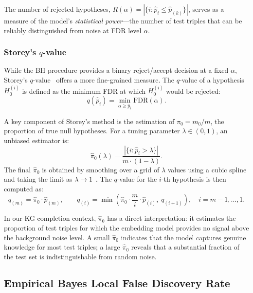 The number of rejected hypotheses, $R(\alpha) = |\{i: \hat{p}_i \leq \hat{p}_{(k)}\}|$, serves as a measure of the model's \emph{statistical power}---the number of test triples that can be reliably distinguished from noise at FDR level $\alpha$.

\subsubsection{Storey's $q$-value}
\label{subsec:qvalue}

While the BH procedure provides a binary reject/accept decision at a fixed $\alpha$, Storey's $q$-value~\cite{storey2002direct, storey2003statistical} offers a more fine-grained measure.
The $q$-value of a hypothesis $H_0^{(i)}$ is defined as the minimum FDR at which $H_0^{(i)}$ would be rejected:
\begin{equation}
    q(\hat{p}_i) = \min_{\alpha \geq \hat{p}_i} \text{FDR}(\alpha).
\end{equation}

A key component of Storey's method is the estimation of $\pi_0 = m_0 / m$, the proportion of true null hypotheses.
For a tuning parameter $\lambda \in (0, 1)$, an unbiased estimator is:
\begin{equation}
    \hat{\pi}_0(\lambda) = \frac{|\{i : \hat{p}_i > \lambda\}|}{m \cdot (1 - \lambda)}.
    \label{eq:pi0}
\end{equation}
The final $\hat{\pi}_0$ is obtained by smoothing over a grid of $\lambda$ values using a cubic spline and taking the limit as $\lambda \to 1$~\cite{storey2002direct}.
The $q$-value for the $i$-th hypothesis is then computed as:
\begin{equation}
    q_{(m)} = \hat{\pi}_0 \cdot \hat{p}_{(m)}, \qquad
    q_{(i)} = \min\left(\hat{\pi}_0 \cdot \frac{m}{i} \cdot \hat{p}_{(i)}, \; q_{(i+1)}\right), \quad i = m-1, \dots, 1.
\end{equation}

In our KG completion context, $\hat{\pi}_0$ has a direct interpretation: it estimates the proportion of test triples for which the embedding model provides no signal above the background noise level.
A small $\hat{\pi}_0$ indicates that the model captures genuine knowledge for most test triples; a large $\hat{\pi}_0$ reveals that a substantial fraction of the test set is indistinguishable from random noise.

\subsection{Empirical Bayes Local False Discovery Rate}
\label{subsec:locfdr}

